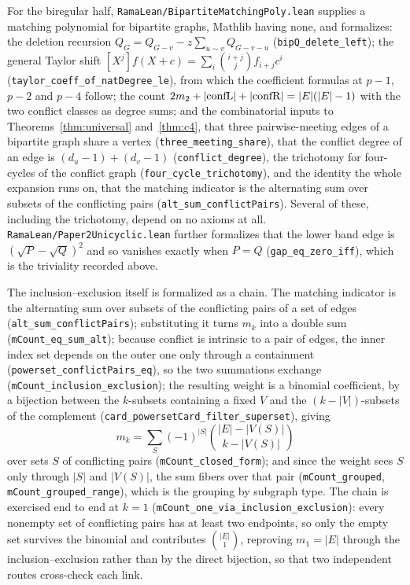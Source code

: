 \documentclass[11pt]{article}
\theoremstyle{remark}
\begin{document}
For the biregular half, \texttt{RamaLean/BipartiteMatchingPoly.lean} supplies a
matching polynomial for bipartite graphs, Mathlib having none, and formalizes:
the deletion recursion $Q_G=Q_{G-v}-z\sum_{u\sim v}Q_{G-v-u}$
(\texttt{bipQ\_delete\_left}); the general Taylor shift
$[X^j]f(X+c)=\sum_i\binom{i+j}{j}f_{i+j}c^i$
(\texttt{taylor\_coeff\_of\_natDegree\_le}), from which the coefficient formulas at
$p-1$, $p-2$ and $p-4$ follow; the count $2m_2+|{\rm confL}|+|{\rm confR}|=|E|(|E|-1)$
with the two conflict classes as degree sums; and the combinatorial inputs to
Theorems~\ref{thm:universal} and~\ref{thm:c4}, that three pairwise-meeting edges
of a bipartite graph share a vertex (\texttt{three\_meeting\_share}), that the
conflict degree of an edge is $(d_u-1)+(d_v-1)$ (\texttt{conflict\_degree}), the
trichotomy for four-cycles of the conflict graph
(\texttt{four\_cycle\_trichotomy}), and the identity the whole expansion runs on,
that the matching indicator is the alternating sum over subsets of the conflicting
pairs (\texttt{alt\_sum\_conflictPairs}). Several of these, including the
trichotomy, depend on no axioms at all. \texttt{RamaLean/Paper2Unicyclic.lean}
further formalizes that the lower band edge is $(\sqrt P-\sqrt Q)^2$ and so
vanishes exactly when $P=Q$ (\texttt{gap\_eq\_zero\_iff}), which is the triviality
recorded above.

The inclusion--exclusion itself is formalized as a chain. The matching indicator is
the alternating sum over subsets of the conflicting pairs of a set of edges
(\texttt{alt\_sum\_conflictPairs}); substituting it turns $m_k$ into a double sum
(\texttt{mCount\_eq\_sum\_alt}); because conflict is intrinsic to a pair of edges,
the inner index set depends on the outer one only through a containment
(\texttt{powerset\_conflictPairs\_eq}), so the two summations exchange
(\texttt{mCount\_inclusion\_exclusion}); the resulting weight is a binomial
coefficient, by a bijection between the $k$-subsets containing a fixed $V$ and the
$(k-|V|)$-subsets of the complement
(\texttt{card\_powersetCard\_filter\_superset}), giving
\[
m_k=\sum_{S}(-1)^{|S|}\binom{|E|-|V(S)|}{k-|V(S)|}
\]
over sets $S$ of conflicting pairs (\texttt{mCount\_closed\_form}); and since the
weight sees $S$ only through $|S|$ and $|V(S)|$, the sum fibers over that pair
(\texttt{mCount\_grouped}, \texttt{mCount\_grouped\_range}), which is the grouping
by subgraph type. The chain is exercised end to end at $k=1$
(\texttt{mCount\_one\_via\_inclusion\_exclusion}): every nonempty set of
conflicting pairs has at least two endpoints, so only the empty set survives the
binomial and contributes $\binom{|E|}{1}$, reproving $m_1=|E|$ through the
inclusion--exclusion rather than by the direct bijection, so that two independent
routes cross-check each link.
\end{document}

